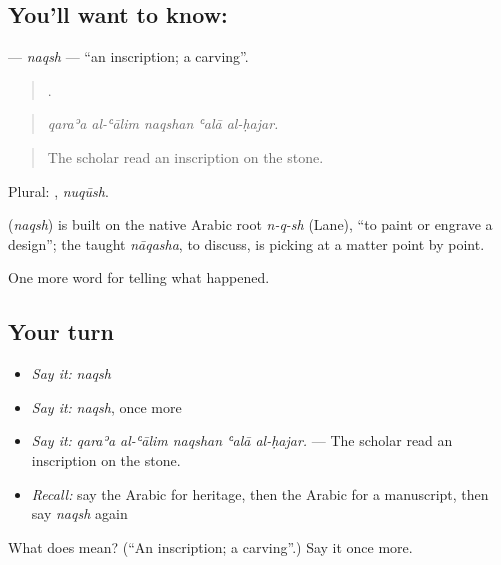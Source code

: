 \subsection*{You'll want to know: }
\textbf{} — \emph{naqsh} — \textquotedblleft{}an inscription; a carving\textquotedblright{}.

\begin{quote}
    .
\end{quote}

\begin{quote}
\emph{qaraʾa al-ʿālim naqshan ʿalā al-ḥajar.}
\end{quote}

\begin{quote}
The scholar read an inscription on the stone.
\end{quote}

Plural: , \emph{nuqūsh}.

\begin{cousinweb}
\textbf{} (\emph{naqsh}) is built on the native Arabic root \emph{n-q-sh} (Lane), \textquotedblleft{}to paint or engrave a design\textquotedblright{}; the taught \emph{nāqasha}, to discuss, is picking at a matter point by point.
\end{cousinweb}

\begin{grammarlens}[title={What you've built}]
One more word for telling what happened.
\end{grammarlens}

\subsection*{Your turn}
\begin{itemize}
\raggedright
  \item \emph{Say it:} \emph{naqsh}
  \item \emph{Say it:} \emph{naqsh}, once more
  \item \emph{Say it:} \emph{qaraʾa al-ʿālim naqshan ʿalā al-ḥajar.} — The scholar read an inscription on the stone.
  \item \emph{Recall:} say the Arabic for heritage, then the Arabic for a manuscript, then say \emph{naqsh} again
\end{itemize}

\begin{tcolorbox}[breakable,colback=teal!4,colframe=teal!35!black,title={Before you move on}]
What does  mean? (\textquotedblleft{}An inscription; a carving\textquotedblright{}.) Say it once more.
\end{tcolorbox}

